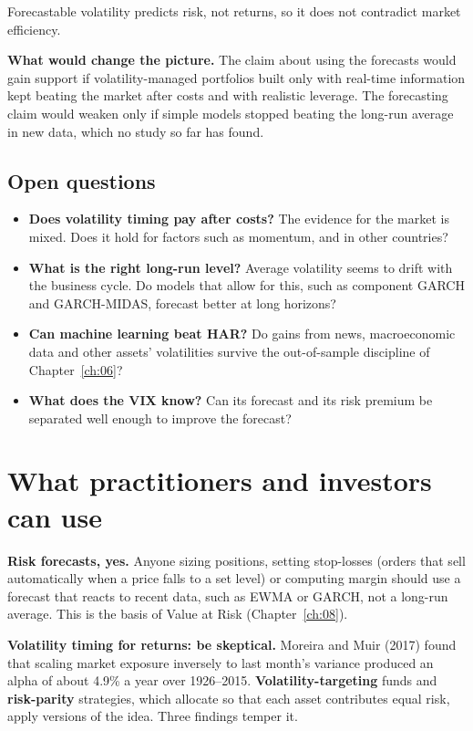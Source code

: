 Forecastable volatility predicts risk, not returns, so it does not contradict market efficiency.

\textbf{What would change the picture.} The claim about using the forecasts would gain support if volatility-managed portfolios built only with real-time information kept beating the market after costs and with realistic leverage. The forecasting claim would weaken only if simple models stopped beating the long-run average in new data, which no study so far has found.

\subsection{Open questions}
\label{sec:10-open}

\begin{itemize}
  \item \textbf{Does volatility timing pay after costs?} The evidence for the market is mixed. Does it hold for factors such as momentum, and in other countries?
  \item \textbf{What is the right long-run level?} Average volatility seems to drift with the business cycle. Do models that allow for this, such as component GARCH and GARCH-MIDAS, forecast better at long horizons?
  \item \textbf{Can machine learning beat HAR?} Do gains from news, macroeconomic data and other assets' volatilities survive the out-of-sample discipline of Chapter~\ref{ch:06}?
  \item \textbf{What does the VIX know?} Can its forecast and its risk premium be separated well enough to improve the forecast?
\end{itemize}

\section{What practitioners and investors can use}
\label{sec:10-investors}

\textbf{Risk forecasts, yes.} Anyone sizing positions, setting stop-losses (orders that sell automatically when a price falls to a set level) or computing margin should use a forecast that reacts to recent data, such as EWMA or GARCH, not a long-run average. This is the basis of Value at Risk (Chapter~\ref{ch:08}).

\textbf{Volatility timing for returns: be skeptical.} Moreira and Muir (2017) found that scaling market exposure inversely to last month's variance produced an alpha of about 4.9\% a year over 1926--2015. \textbf{Volatility-targeting} funds and \textbf{risk-parity} strategies, which allocate so that each asset contributes equal risk, apply versions of the idea. Three findings temper it.

